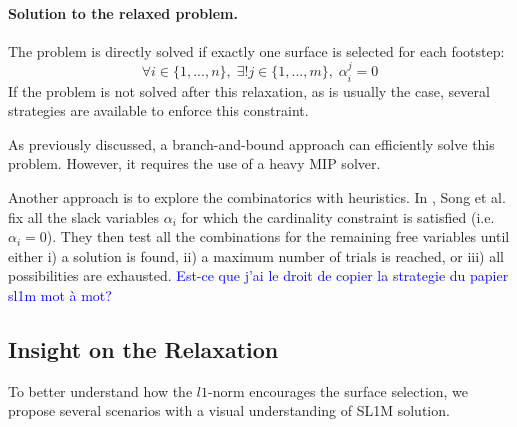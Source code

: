 \paragraph{Solution to the relaxed problem.\label{par:sl1m:solution_relaxed_heuristics}}
The problem is directly solved if exactly one surface is selected for each footstep:
\begin{equation}
    \label{eq:sl1m:pb_solved}
    \forall i \in \{1,...,n\},\; \exists! j \in \{1,...,m\},\; \alpha^j_i = 0
\end{equation}
If the problem is not solved after this relaxation, as is usually the case, several strategies are available to enforce this constraint.

As previously discussed, a branch-and-bound approach can efficiently solve this problem. 
However, it requires the use of a heavy MIP solver.

Another approach is to explore the combinatorics with heuristics.
In \cite{sl1m_v2}, Song et al. fix all the slack variables $\alpha_i$ for which the cardinality
constraint is satisfied (i.e. $\alpha_i=0$). 
They then test all the combinations for the remaining free variables until either i) a solution is found, ii) a maximum number of trials is reached, or iii) all possibilities are exhausted.  \textcolor{blue}{Est-ce que j'ai le droit de copier la strategie du papier sl1m mot à mot?}

\subsection{Insight on the Relaxation\label{subsub:insight_l1}}
To better understand how the $l1$-norm encourages the surface selection, we propose several scenarios with a visual understanding of SL1M solution.

